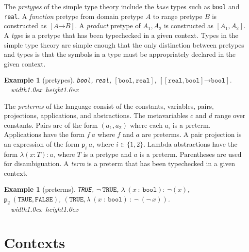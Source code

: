 \documentclass [12pt,twoside]{cslreport}
\newcommand{\thmbox}
   {{\ \hfill\hbox{%
      \vrule width1.0ex height1.0ex
   }\parfillskip 0pt }}
\newtheorem{example}[thm]{Example}
\newcommand{\aro}{\mathord\rightarrow} %
\newcommand{\funtype}[2]{[#1 \aro #2]}
\newcommand{\tupletype}[1]{[#1]}
\newcommand{\proj}[1]{\mathtt{p}_{#1}}
\newcommand{\listwo}[2]{#1_{1}, #1_{2}}
\newenvironment{Eg}[1]{\begin{example}[#1]\label{eg:#1}\em }{\thmbox\end{example}}
\begin{document}
The \emph{pretypes} of the simple type theory include the \emph{base}
types such as \texttt{bool} and \texttt{real}.  A \emph{function} pretype
from domain pretype $A$ to range pretype $B$ is constructed as
$\funtype{A}{B}$\@.  A \emph{product} pretype of ${\listwo{A}{n}}$ is
constructed as $\tupletype{\listwo{A}{n}}$.    A \emph{type} is a pretype that has been
typechecked in a given context.  Types in the simple type theory are
simple enough  that the only distinction between pretypes and types is
that the symbols in a type must be appropriately declared in the given
context.

\begin{Eg}{pretypes} 
 \texttt{bool}, \texttt{real},
 $\tupletype
{\mathtt{bool}, \mathtt{real}}$,
 $\funtype{\tupletype{\mathtt{real}, \mathtt{bool}}}{ \mathtt{bool}}$.
\end{Eg}

The {\em preterms\/} of the language consist of the constants, variables,
pairs, projections, applications, and abstractions.  The metavariables $c$
and $d$ range over constants.  Pairs are of the form $(a_1, a_2)$ where
each $a_i$ is a preterm.  Applications have the form $f\ a$ where $f$ and
$a$ are preterms.  A pair projection is an expression of the form
$\proj{i}\ a$, where $i\in\{1, 2\}$\@.    Lambda abstractions have the form $\lambda (x : T): a$, where $T$
is a pretype and $a$ is a preterm.    Parentheses
are used for disambiguation.  A \emph{term} is a preterm that has been
typechecked in a given context.

\begin{Eg}{preterms}
\texttt{TRUE}, $\neg~\mathtt{TRUE}$,
$\lambda~(x~:~\mathtt{bool}):~\neg(x)$,\hfill\\
$\proj{2}~(\mathtt{TRUE}, \mathtt{FALSE})$,
$(\mathtt{TRUE},  \lambda~(x~:~\mathtt{bool})~:~\neg~(\neg~x))$.
\end{Eg}

\section{Contexts}
\end{document}
